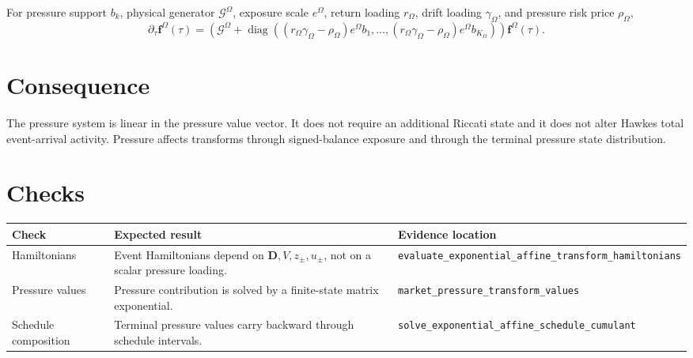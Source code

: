 \documentclass[11pt]{article}
\begin{document}
For pressure support \(b_k\), physical generator \(\mathcal G^\Omega\),
exposure scale \(e^\Omega\), return loading \(r_\Omega\), drift loading
\(\gamma_\Omega\), and pressure risk price \(\rho_\Omega\),
\[
    \partial_\tau\mathbf f^\Omega(\tau)
    =
    \left(
        \mathcal G^\Omega+
        \operatorname{diag}\left(
            (r_\Omega\gamma_\Omega-\rho_\Omega)e^\Omega b_1,
            \ldots,
            (r_\Omega\gamma_\Omega-\rho_\Omega)e^\Omega b_{K_\Omega}
        \right)
    \right)\mathbf f^\Omega(\tau).
\]

\section{Consequence}

The pressure system is linear in the pressure value vector.
It does not require an additional Riccati state and it does not alter Hawkes
total event-arrival activity.
Pressure affects transforms through signed-balance exposure and through the
terminal pressure state distribution.

\section{Checks}

\begin{tabularx}{\textwidth}{XXX}
\toprule
Check & Expected result & Evidence location\\
\midrule
Hamiltonians
& Event Hamiltonians depend on \(\mathbf D,V,z_\pm,u_\pm\), not on a scalar pressure loading.
& \texttt{evaluate\_exponential\_affine\_transform\_hamiltonians}\\
Pressure values
& Pressure contribution is solved by a finite-state matrix exponential.
& \texttt{market\_pressure\_transform\_values}\\
Schedule composition
& Terminal pressure values carry backward through schedule intervals.
& \texttt{solve\_exponential\_affine\_schedule\_cumulant}\\
\bottomrule
\end{tabularx}
\end{document}
